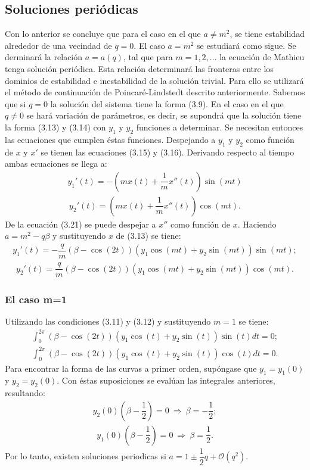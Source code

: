 \subsection{Soluciones periódicas}
Con lo anterior se concluye que para el caso en el que $a\neq m^2$, se tiene estabilidad alrededor de una vecindad de $q=0$. El caso $a=m^2$ se estudiará como sigue. Se derminará la relación $a=a(q)$, tal que para $m=1,2,...$ la ecuación de Mathieu tenga solución periódica. Esta relación determinará las fronteras entre los dominios de estabilidad e inestabilidad de la solución trivial. Para ello se utilizará el método de continuación de Poincaré-Lindstedt descrito anteriormente. Sabemos que si $q=0$ la solución del sistema tiene la forma (3.9). En el caso en el que $q \neq 0$ se hará variación de parámetros, es decir, se supondrá que la solución tiene la forma (3.13) y (3.14) con $y_{1}$ y $y_{2}$ funciones a determinar. Se necesitan entonces las ecuaciones que cumplen éstas funciones. Despejando a $y_{1}$ y $y_{2}$ como función de $x$ y $x'$ se tienen las ecuaciones (3.15) y (3.16). Derivando respecto al tiempo ambas ecuaciones se llega a:
\begin{eqnarray*}
y_{1}'(t)=-(mx(t)+\dfrac{1}{m}x''(t))\sin(mt)
\end{eqnarray*}
\begin{eqnarray*}
y_{2}'(t)=(mx(t)+\dfrac{1}{m}x''(t))\cos(mt).
\end{eqnarray*}
De la ecuación (3.21) se puede despejar a $x''$ como función de $x$. Haciendo $a=m^2-q\beta$ y sustituyendo $x$ de (3.13) se tiene:
\begin{eqnarray}
y_{1}'(t)=-\dfrac{q}{m}(\beta-\cos(2t))(y_{1}\cos(mt)+y_{2}\sin(mt))\sin(mt);
\end{eqnarray}
\begin{eqnarray}
y_{2}'(t)=\dfrac{q}{m}(\beta-\cos(2t))(y_{1}\cos(mt)+y_{2}\sin(mt))\cos(mt).
\end{eqnarray}
\subsubsection{El caso m=1}
Utilizando las condiciones (3.11) y (3.12) y sustituyendo $m=1$ se tiene:
\begin{eqnarray*}
\int_{0}^{2\pi} (\beta-\cos(2t))(y_{1}\cos(t)+y_{2}\sin(t))\sin(t) dt=0;
\end{eqnarray*}
\begin{eqnarray*}
\int_{0}^{2\pi} (\beta-\cos(2t))(y_{1}\cos(t)+y_{2}\sin(t))\cos(t) dt=0.
\end{eqnarray*}
Para encontrar la forma de las curvas a primer orden, supóngase que $y_{1}=y_{1}(0)$ y $y_{2}=y_{2}(0)$. Con éstas suposiciones se evalúan las integrales anteriores, resultando:
\begin{eqnarray}
y_{2}(0)(\beta - \dfrac{1}{2})=0 \ \Longrightarrow \ \beta = -\dfrac{1}{2} ;
\end{eqnarray}
\begin{eqnarray}
y_{1}(0)(\beta - \dfrac{1}{2})=0 \ \Longrightarrow \ \beta = \dfrac{1}{2}.
\end{eqnarray}
Por lo tanto, existen soluciones periodicas si $a=1\pm \dfrac{1}{2}q + \mathcal{O}(q^{2})$.
